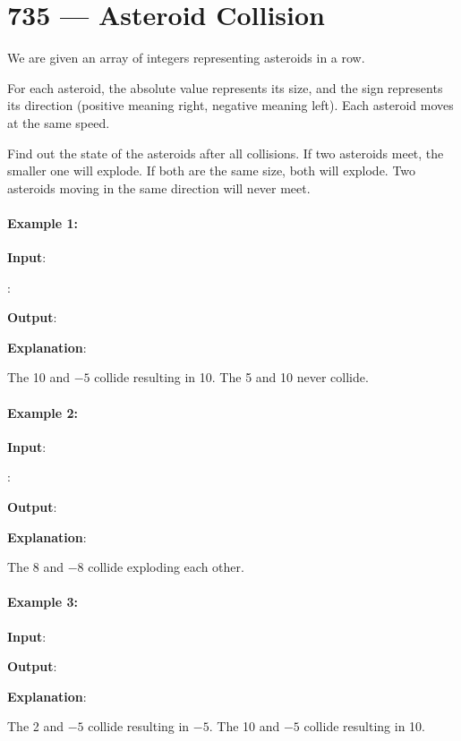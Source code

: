 \section{735 --- Asteroid Collision}
We are given an array  of integers representing asteroids in a row.

For each asteroid, the absolute value represents its size, and the sign represents its direction (positive meaning right, negative meaning left). Each asteroid moves at the same speed.

Find out the state of the asteroids after all collisions. If two asteroids meet, the smaller one will explode. If both are the same size, both will explode. Two asteroids moving in the same direction will never meet.

\paragraph{Example 1:}
\begin{flushleft}

\textbf{Input}: 

: \fcj{[5, 10, -5]}

\textbf{Output}: \fcj{[5, 10]}

\textbf{Explanation}: 

The 10 and $-5$ collide resulting in 10.  The 5 and 10 never collide.
\end{flushleft}
\paragraph{Example 2:}
\begin{flushleft}

\textbf{Input}: 

: \fcj{[8, -8]}

\textbf{Output}: \fcj{[]}

\textbf{Explanation}: 

The 8 and $-8$ collide exploding each other.
\end{flushleft}
\paragraph{Example 3:}
\begin{flushleft}

\textbf{Input}: 

\textbf{Output}: \fcj{[10]}

\textbf{Explanation}:
 
The 2 and $-5$ collide resulting in $-5$.  The 10 and $-5$ collide resulting in 10.
\end{flushleft}
